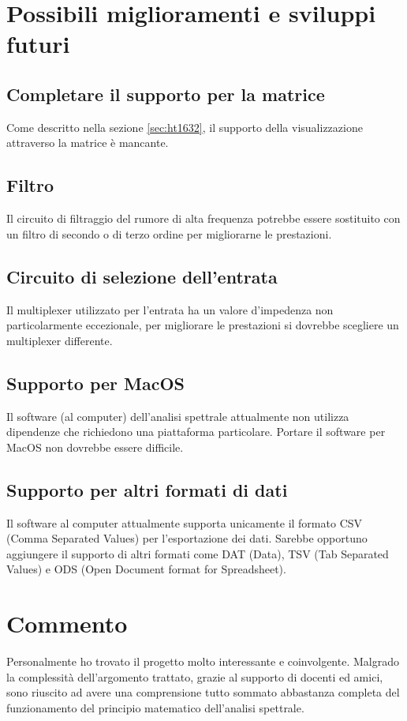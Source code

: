 \section{Possibili miglioramenti e sviluppi futuri}
\subsection{Completare il supporto per la matrice}
Come descritto nella sezione \ref{sec:ht1632}, il supporto della visualizzazione
attraverso la matrice \`e mancante.

\subsection{Filtro}
Il circuito di filtraggio del rumore di alta frequenza potrebbe essere
sostituito con un filtro di secondo o di terzo ordine per migliorarne le
prestazioni.

\subsection{Circuito di selezione dell'entrata}
Il multiplexer utilizzato per l'entrata ha un valore d'impedenza non
particolarmente eccezionale, per migliorare le prestazioni si dovrebbe
scegliere un multiplexer differente.

\subsection{Supporto per MacOS}
Il software (al computer) dell'analisi spettrale attualmente non utilizza
dipendenze che richiedono una piattaforma particolare. Portare il software per
MacOS non dovrebbe essere difficile.

\subsection{Supporto per altri formati di dati}
Il software al computer attualmente supporta unicamente il formato CSV (Comma
Separated Values) per l'esportazione dei dati. Sarebbe opportuno aggiungere il
supporto di altri formati come DAT (Data), TSV (Tab Separated Values) e ODS
(Open Document format for Spreadsheet).

\section{Commento}
Personalmente ho trovato il progetto molto interessante e coinvolgente.
Malgrado la complessit\`a dell'argomento trattato, grazie al supporto di
docenti ed amici, sono riuscito ad avere una comprensione tutto sommato
abbastanza completa del funzionamento del principio matematico dell'analisi
spettrale.

